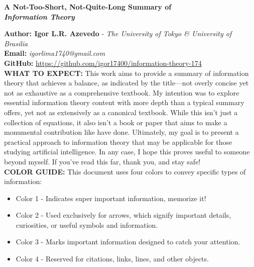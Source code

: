 \documentclass[a4paper,10pt]{article}
\begin{document}
\noindent 
\begin{center}
\textbf{{\LARGE A Not-Too-Short, Not-Quite-Long Summary of \\ \textit{Information Theory}}} 
\end{center}
\vspace{1cm}

\noindent 
\textbf{Author: Igor L.R. Azevedo} - \textit{The University of Tokyo \& University of Brasilia}
\\
\textbf{Email:} \textit{igorlima1740@gmail.com}
\\
\textbf{GitHub:} \url{https://github.com/igor17400/information-theory-174}
\\


\noindent 
\textbf{WHAT TO EXPECT: } This work aims to provide a summary of information theory that achieves a balance, as indicated by the title—not overly concise yet not as exhaustive as a comprehensive textbook. My intention was to explore essential information theory content with more depth than a typical summary offers, yet not as extensively as a canonical textbook. While this isn't just a collection of equations, it also isn't a book or paper that aims to make a monumental contribution like \cite{mackay_book, willey_info_theory} have done. Ultimately, my goal is to present a practical approach to information theory that may be applicable for those studying artificial intelligence. In any case, I hope this proves useful to someone beyond myself. If you've read this far, thank you, and stay safe!
\\

\noindent
\textbf{COLOR GUIDE:} This document uses four colors to convey specific types of information:
\begin{itemize}
    \item \colorbox{color1}{Color 1} - Indicates super important information, memorize it!
    \item \colorbox{color2}{Color 2} - Used exclusively for arrows, which signify important details, curiosities, or useful symbols and information.
    \item \colorbox{color3}{Color 3} - Marks important information designed to catch your attention.
    \item \colorbox{color4}{Color 4} - Reserved for citations, links, lines, and other objects.
\end{itemize}
\end{document}

